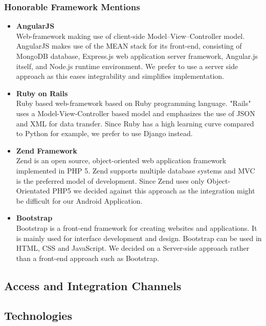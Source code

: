 \documentclass{article}
\begin{document}
	\subsubsection{Honorable Framework Mentions}
	\begin{itemize}
	
	
	\item\textbf{AngularJS}\label{subsubsec: AngularJS} \\
	Web-framework making use of client-side Model–View–Controller model. 
		AngularJS makes use of the MEAN stack for its front-end, consisting of MongoDB database, Express.js web application server framework, Angular.js itself, and Node.js runtime environment.
		We prefer to use a server side approach as this eases integrability and simplifies implementation.
	\item\textbf{Ruby on Rails}\label{subsubsec: Rails} \\
		Ruby based web-framework based on Ruby programming language. "Rails" uses a Model-View-Controller based model and emphasizes the use of JSON and XML for data transfer.
		Since Ruby has a high learning curve compared to Python for example, we prefer to use Django instead.
	\item\textbf{Zend Framework}\label{subsubsec: Zend}\\
	 Zend is an open source, object-oriented web application framework implemented in PHP 5. Zend supports multiple database systems and MVC is the preferred model of development.
	 Since Zend uses only Object-Orientated PHP5 we decided against this approach as the integration might be difficult for our Android Application.
	 \item\textbf{Bootstrap}\label{subsubsec: Bootstrap}\\
	 Bootstrap is a front-end framework for creating websites and applications. It is mainly used for interface development and design. Bootstrap can be used in HTML, CSS and JavaScript. 
	 We decided on a Server-side approach rather than a front-end approach such as Bootstrap.
	\end{itemize}
	
	\subsection{Access and Integration Channels}
	
	\subsection{Technologies}
\end{document}
